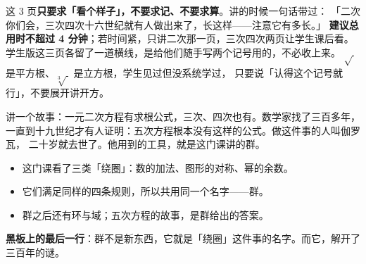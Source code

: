 \begin{zhu}
  这 3 页\textbf{只要求「看个样子」，不要求记、不要求算}。讲的时候一句话带过：
  「二次你们会，三次四次十六世纪就有人做出来了，长这样——注意它有多长。」
  \textbf{建议总用时不超过 4 分钟}；若时间紧，只讲二次那一页，三次四次两页让学生课后看。
  学生版这三页各留了一道横线，是给他们随手写两个记号用的，不必收上来。
  \(\sqrt{\ }\) 是平方根、\(\sqrt[3]{\ }\) 是立方根，学生见过但没系统学过，
  只要说「认得这个记号就行」，不要展开讲开方。
\end{zhu}

\begin{caozuo}
  讲一个故事：一元二次方程有求根公式，三次、四次也有。数学家找了三百多年，
  一直到十九世纪才有人证明：五次方程根本没有这样的公式。做这件事的人叫伽罗瓦，
  二十岁就去世了。他用到的工具，就是这门课讲的群。
\end{caozuo}

\begin{xiaojie}
  \begin{itemize}
    \item 这门课看了三类「绕圈」：数的加法、图形的对称、幂的余数。
    \item 它们满足同样的四条规则，所以共用同一个名字——群。
    \item 群之后还有环与域；五次方程的故事，是群给出的答案。
  \end{itemize}
\end{xiaojie}

\noindent\textbf{黑板上的最后一行}：群不是新东西，它就是「绕圈」这件事的名字。而它，解开了三百年的谜。